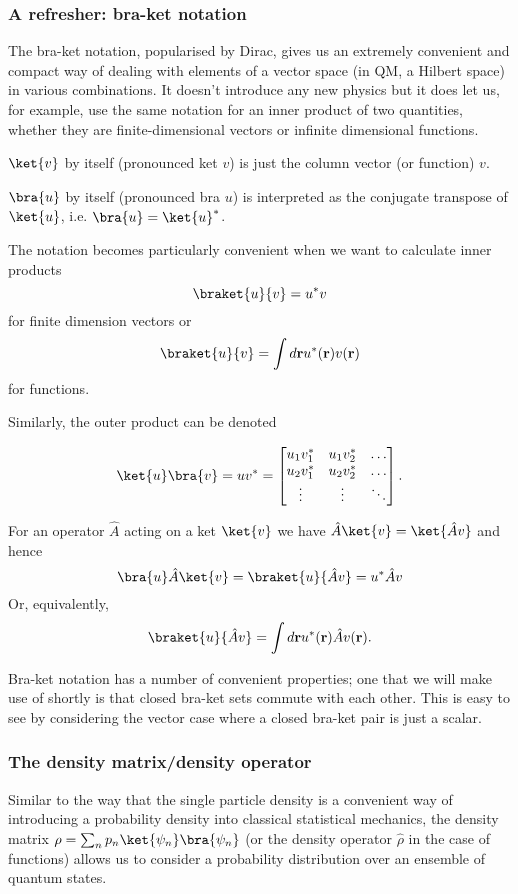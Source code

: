 \subsubsection{A refresher: bra-ket notation}
The bra-ket notation, popularised by Dirac, gives us an extremely convenient and compact way of dealing with elements of a vector space (in QM, a Hilbert space) in various combinations. It doesn't introduce any new physics but it does let us, for example, use the same notation for an inner product of two quantities, whether they are finite-dimensional vectors or infinite dimensional functions.

$\ket{v}$ by itself (pronounced ket $v$) is just the column vector (or function) $v$.

$\bra{u}$ by itself (pronounced bra $u$) is interpreted as the conjugate transpose of $\ket{u}$, i.e. $\bra{u}=\ket{u}^*$.

The notation becomes particularly convenient when we want to calculate inner products
$$
	\braket{u}{v} = u^*v
$$
for finite dimension vectors or 
$$
	\braket{u}{v} =	\int d{\bf r}u^*({\bf r})v({\bf r})
$$
for functions.

Similarly, the outer product can be denoted 

$$
\ket{u}\bra{v}=uv^* =
\begin{bmatrix}
    u_1v^*_1 & u_1v^*_2  & \dots \\
    u_2v^*_1 & u_2v^*_2  & \dots   \\
    \vdots & \vdots & \ddots 
\end{bmatrix}.
$$

For an operator $\hat{A}$ acting on a ket $\ket{v}$ we have $\hat{A}\ket{v} = \ket{\hat{A}v}$ and hence 
$$
	\bra{u}\hat{A}\ket{v}=\braket{u}{\hat{A}v} = u^*\hat{A}v
$$
Or, equivalently,  
$$
	\braket{u}{\hat{A}v} = \int d{\bf r} u^*({\bf r}) \hat{A} v({\bf r}).
$$

Bra-ket notation has a number of convenient properties; one that we will make use of shortly is that closed bra-ket sets commute with each other. This is easy to see by considering the vector case where a closed bra-ket pair is just a scalar.

\subsubsection*{The density matrix/density operator}
Similar to the way that the single particle density is a convenient way of introducing a probability density into classical statistical mechanics, the density matrix $\rho = \sum_n p_n\ket{\psi_n}\bra{\psi_n}$ (or the density operator $\hat{\rho}$ in the case of functions) allows us to consider a probability distribution over an ensemble of quantum states.

